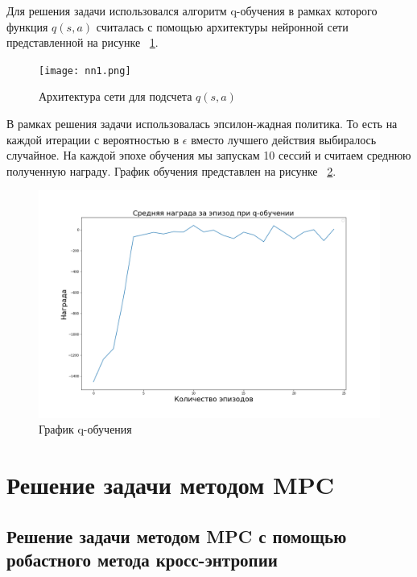Для решения задачи использовался алгоритм q-обучения в рамках которого функция $q(s, a)$ считалась с помощью архитектуры нейронной сети представленной на рисунке ~\ref{fig:q-nn}.

\begin{figure}[h]
	\centering
	\texttt{[image: nn1.png]}
	\caption {Архитектура сети для подсчета $q(s, a)$}
	\label{fig:q-nn}
\end{figure}

\newpage

В рамках решения задачи использовалась эпсилон-жадная политика. То есть на каждой итерации с вероятностью в $\epsilon$ вместо лучшего действия выбиралось случайное. На каждой эпохе обучения мы запускам 10 сессий и считаем среднюю полученную награду. График обучения представлен на рисунке ~\ref{fig:rews}.

\newpage

\begin{figure}[h]
	\centering
	\includegraphics[scale=0.5]{rews.png}
	\caption {График q-обучения}
	\label{fig:rews}
\end{figure}



\section{Решение задачи методом MPC }\label{1sec:optimal-control}

\subsection{Решение задачи методом MPC с помощью робастного метода кросс-энтропии }\label{1sec:optimal-control}

